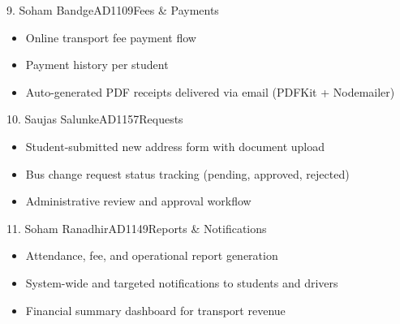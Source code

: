 \documentclass[11pt,a4paper]{report}
\begin{document}
\begin{membercard}{9. Soham Bandge}{AD1109}{Fees \& Payments}
\begin{itemize}[leftmargin=1.2em, itemsep=1pt]
  \item Online transport fee payment flow
  \item Payment history per student
  \item Auto-generated PDF receipts delivered via email (PDFKit + Nodemailer)
\end{itemize}
\end{membercard}

\begin{membercard}{10. Saujas Salunke}{AD1157}{Requests}
\begin{itemize}[leftmargin=1.2em, itemsep=1pt]
  \item Student-submitted new address form with document upload
  \item Bus change request status tracking (pending, approved, rejected)
  \item Administrative review and approval workflow
\end{itemize}
\end{membercard}

\begin{membercard}{11. Soham Ranadhir}{AD1149}{Reports \& Notifications}
\begin{itemize}[leftmargin=1.2em, itemsep=1pt]
  \item Attendance, fee, and operational report generation
  \item System-wide and targeted notifications to students and drivers
  \item Financial summary dashboard for transport revenue
\end{itemize}
\end{membercard}
\end{document}
